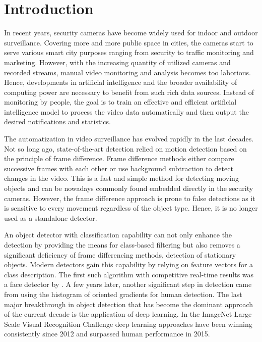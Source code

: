 \chapter*{Introduction}

In recent years, security cameras have become widely used for indoor and outdoor surveillance. Covering more and more public space in cities, the cameras start to serve various smart city purposes ranging from security to traffic monitoring and marketing. However, with the increasing quantity of utilized cameras and recorded streams, manual video monitoring and analysis becomes too laborious. Hence, developments in artificial intelligence and the broader availability of computing power are necessary to benefit from such rich data sources. Instead of monitoring by people, the goal is to train an effective and efficient artificial intelligence model to process the video data automatically and then output the desired notifications and statistics.

The automatization in video surveillance has evolved rapidly in the last decades. Not so long ago, state-of-the-art detection relied on motion detection based on the principle of frame difference. Frame difference methods either compare successive frames with each other or use background subtraction to detect changes in the video. This is a fast and simple method for detecting moving objects and can be nowadays commonly found embedded directly in the security cameras. However, the frame difference approach is prone to false detections as it is sensitive to every movement regardless of the object type. Hence, it is no longer used as a standalone detector.

An object detector with classification capability can not only enhance the detection by providing the means for class-based filtering but also removes a significant deficiency of frame differencing methods, detection of stationary objects.  Modern detectors gain this capability by relying on feature vectors for a class description. The first such algorithm with competitive real-time results was a face detector by \citeauthor{bib:viola}. A few years later, another significant step in detection came from \citeauthor{bib:hog} using the histogram of oriented gradients for human detection. The last major breakthrough in object detection that has become the dominant approach of the current decade is the application of deep learning. In the ImageNet Large Scale Visual Recognition Challenge deep learning approaches have been winning consistently since 2012 and surpassed human performance in 2015.


